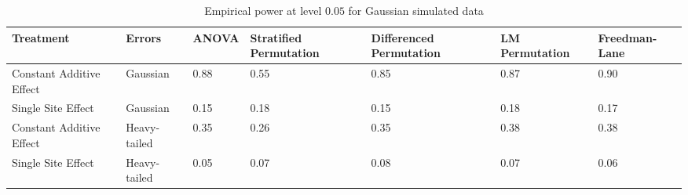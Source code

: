\begin{table}[ht]
\centering
\begin{tabular}{p{1.25in}|p{0.7in}|p{0.6in}p{0.8in}p{0.8in}p{0.8in}p{0.75in}}
  \hline
Treatment & Errors & ANOVA & Stratified Permutation & Differenced Permutation & LM Permutation & Freedman-Lane \\ 
  \hline
Constant Additive Effect & Gaussian & 0.88 & 0.55 & 0.85 & 0.87 & 0.90 \\ 
  Single Site Effect & Gaussian & 0.15 & 0.18 & 0.15 & 0.18 & 0.17 \\ 
  Constant Additive Effect & Heavy-tailed & 0.35 & 0.26 & 0.35 & 0.38 & 0.38 \\ 
  Single Site Effect & Heavy-tailed & 0.05 & 0.07 & 0.08 & 0.07 & 0.06 \\ 
   \hline
\end{tabular}
\caption{Empirical power at level $0.05$ for Gaussian simulated data} 
\end{table}
